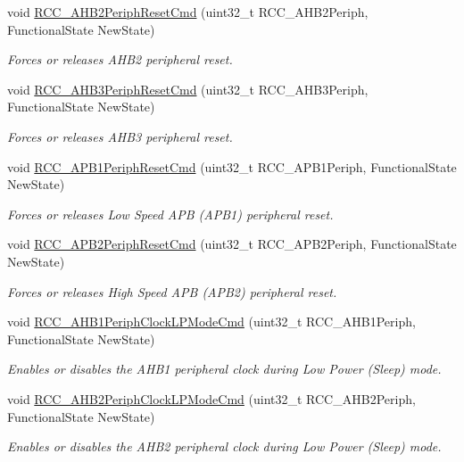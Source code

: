 \begin{DoxyCompactItemize}
void \hyperlink{group___r_c_c_gafb119d6d1955d1b8c361e8140845ac5a}{R\-C\-C\-\_\-\-A\-H\-B2\-Periph\-Reset\-Cmd} (uint32\-\_\-t R\-C\-C\-\_\-\-A\-H\-B2\-Periph, Functional\-State New\-State)
\begin{DoxyCompactList}\small\item\em Forces or releases A\-H\-B2 peripheral reset. \end{DoxyCompactList}\item 
void \hyperlink{group___r_c_c_gaee44f159a1ca9ebdd7117bff387cd592}{R\-C\-C\-\_\-\-A\-H\-B3\-Periph\-Reset\-Cmd} (uint32\-\_\-t R\-C\-C\-\_\-\-A\-H\-B3\-Periph, Functional\-State New\-State)
\begin{DoxyCompactList}\small\item\em Forces or releases A\-H\-B3 peripheral reset. \end{DoxyCompactList}\item 
void \hyperlink{group___r_c_c_gab197ae4369c10b92640a733b40ed2801}{R\-C\-C\-\_\-\-A\-P\-B1\-Periph\-Reset\-Cmd} (uint32\-\_\-t R\-C\-C\-\_\-\-A\-P\-B1\-Periph, Functional\-State New\-State)
\begin{DoxyCompactList}\small\item\em Forces or releases Low Speed A\-P\-B (A\-P\-B1) peripheral reset. \end{DoxyCompactList}\item 
void \hyperlink{group___r_c_c_gad94553850ac07106a27ee85fec37efdf}{R\-C\-C\-\_\-\-A\-P\-B2\-Periph\-Reset\-Cmd} (uint32\-\_\-t R\-C\-C\-\_\-\-A\-P\-B2\-Periph, Functional\-State New\-State)
\begin{DoxyCompactList}\small\item\em Forces or releases High Speed A\-P\-B (A\-P\-B2) peripheral reset. \end{DoxyCompactList}\item 
void \hyperlink{group___r_c_c_ga5cd0d5adbc7496d7005b208bd19ce255}{R\-C\-C\-\_\-\-A\-H\-B1\-Periph\-Clock\-L\-P\-Mode\-Cmd} (uint32\-\_\-t R\-C\-C\-\_\-\-A\-H\-B1\-Periph, Functional\-State New\-State)
\begin{DoxyCompactList}\small\item\em Enables or disables the A\-H\-B1 peripheral clock during Low Power (Sleep) mode. \end{DoxyCompactList}\item 
void \hyperlink{group___r_c_c_ga1ac5bb9676ae9b48e50d6a95de922ce3}{R\-C\-C\-\_\-\-A\-H\-B2\-Periph\-Clock\-L\-P\-Mode\-Cmd} (uint32\-\_\-t R\-C\-C\-\_\-\-A\-H\-B2\-Periph, Functional\-State New\-State)
\begin{DoxyCompactList}\small\item\em Enables or disables the A\-H\-B2 peripheral clock during Low Power (Sleep) mode. \end{DoxyCompactList}\item 

\end{DoxyCompactItemize}
